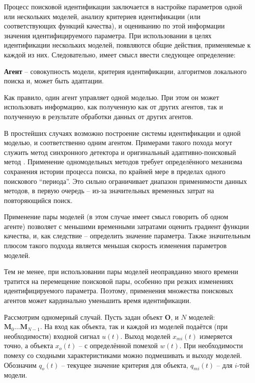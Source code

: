 \documentclass[a4paper,paratype,12pt,fouriernc]{cmonogra}
\begin{document}
Процесс поисковой идентификации заключается в настройке параметров одной
или нескольких моделей, анализу критериев идентификации
(или соответствующих функций качества), и оцениванию по этой информации
значения идентифицируемого параметра. При использовании в целях идентификации нескольких моделей,
появляются общие действия, применяемые к каждой из них. Следовательно, имеет смысл ввести следующее определение:


\textbf{ Агент } -- совокупность модели, критерия идентификации,
алгоритмов локального поиска и, может быть адаптации.

Как правило, один агент управляет одной моделью. При этом
он может использовать информацию, как полученную как от других
агентов, так и полученную в результате обработки данных от других агентов.

В простейших случаях возможно построение системы идентификации
и одной моделью, и соответственно одним агентом. %
Примерами такого похода могут служить
метод синхронного детектора \cite{adopt_cont_sys}
и оригинальный адаптивно-поисковый метод \cite{mich_92}.
Применение одномодельных методов требует определённого механизма
сохранения истории процесса поиска, по крайней мере в пределах
одного поискового ``периода''. Это сильно ограничивает диапазон
применимости данных методов, в первую очередь -- из-за значительных
временных затрат на повторяющийся поиск.

Применение пары моделей (в этом случае имеет смысл говорить об одном агенте)
позволяет с меньшими временными затратами оценить градиент функции качества,
и, как следствие -- определить значение параметра. Также значительным плюсом
такого подхода является меньшая скорость изменения параметров моделей.

Тем не менее, при использовании пары моделей неоправданно много времени
тратится на перемещение поисковой пары, особенно при резких изменениях
идентифицируемого параметра. Поэтому, применения множества
поисковых агентов может кардинально уменьшить время идентификации.

Рассмотрим одномерный случай.
Пусть задан объект $ \mathbf{O} $, и $N$ моделей:
$ \mathbf{M}_0 \ldots \mathbf{M}_{N-1} $.
На вход как объекта, так и каждой из моделей подаётся (при необходимости)
входной сигнал $u(t)$. Выход моделей $x_{mi}(t)$ измеряется точно,
а объекта $x_o(t)$ -- с определённой помехой $w(t)$. При необходимости помеху
со сходными характеристиками можно подмешивать и выходу моделей.
Обозначим $q_o(t)$ -- текущее значение критерия для
объекта, $q_{mi}(t)$ -- для $i$-той модели.
\end{document}
